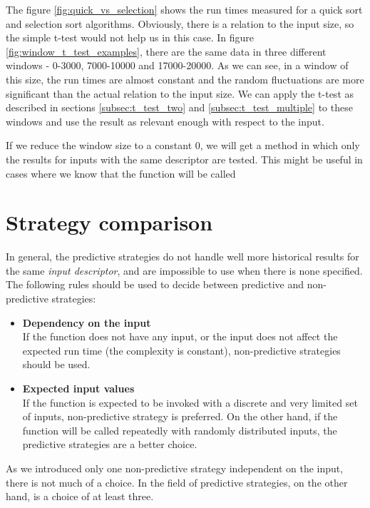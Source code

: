 The figure \ref{fig:quick_vs_selection} shows the run times measured for a quick sort and selection sort algorithms. Obviously, there is a relation to the input size, so the simple t-test would not help us in this case. In figure \ref{fig:window_t_test_examples}, there are the same data in three different windows - 0-3000, 7000-10000 and 17000-20000. As we can see, in a window of this size, the run times are almost constant and the random fluctuations are more significant than the actual relation to the input size. We can apply the t-test as described in sections \ref{subsec:t_test_two} and \ref{subsec:t_test_multiple} to these windows and use the result as relevant enough with respect to the input.

If we reduce the window size to a constant 0, we will get a method in which only the results for inputs with the same descriptor are tested. This might be useful in cases where we know that the function will be called 

\section{Strategy comparison}
\label{sec:strategy_comparison}

In general, the predictive strategies do not handle well more historical results for the same \textit{input descriptor}, and are impossible to use when there is none specified. The following rules should be used to decide between predictive and non-predictive strategies:

\begin{itemize}
	\item \textbf{Dependency on the input} \\
	If the function does not have any input, or the input does not affect the expected run time (the complexity is constant), non-predictive strategies should be used.
	\item \textbf{Expected input values} \\
	If the function is expected to be invoked with a discrete and very limited set of inputs, non-predictive strategy is preferred. On the other hand, if the function will be called repeatedly with randomly distributed inputs, the predictive strategies are a better choice.
\end{itemize}

As we introduced only one non-predictive strategy independent on the input, there is not much of a choice. In the field of predictive strategies, on the other hand, is a choice of at least three.

